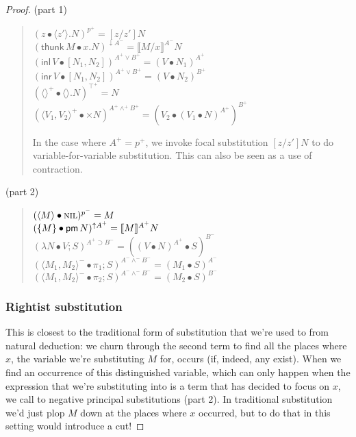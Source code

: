 \documentclass[acmtocl]{robtrans}\pdfoutput=1
\newcommand{\susp}[1]{\langle{#1}\rangle}
\newcommand{\llangle}{\llbracket}
\newcommand{\rrangle}{\rrbracket}
\newcommand{\dsrt}[1]{\mathsf{thunk}\,{#1}}
\newcommand{\etart}[1]{\langle{#1}\rangle} \newcommand{\etalt}[2]{\susp{#1}.{#2}}
\begin{document}
\begin{proof}
\bigskip
{} (part 1)
\begin{quote}
$(z \bullet \etalt{z'}{N})^{p^+} = [z/z']N$\\
$(\dsrt{M} \bullet x.N)^{{\downarrow}A^-}
   = \llbracket M/x \rrbracket^{A^-} N $\\
$(\mathsf{inl}\,V \bullet [N_1 , N_2 ])^{A^+ \vee B^+}
   = (V \bullet N_1)^{A^+}$\\
$(\mathsf{inr}\,V \bullet [N_1 , N_2 ])^{A^+ \vee B^+} 
   = (V \bullet N_2)^{B^+}$\\
$(\langle\rangle^+ \bullet \langle\rangle.N)^{\top^+} = N$\\
$(\langle V_1, V_2\rangle^+ \bullet {\times}N)^{A^+ \wedge^+ B^+} 
   = (V_2 \bullet (V_1 \bullet N)^{A^+})^{B^+}$

\medskip
In the case where $A^+ = p^+$, we invoke focal substitution $[z/z']N$
to do variable-for-variable substitution. This can also be seen as 
a use of contraction.
\end{quote}

\medskip
{} (part 2)
\begin{quote}
$(\etart{M} \bullet \textsc{nil})^{p^-} = M$\\
$(\usrt{M} \bullet \uslt{N})^{{\uparrow}A^+} = \llangle M \rrangle^{A^+} N$\\
$(\lambda N \bullet V; S)^{A^+ \supset B^-} 
   = ((V \bullet N)^{A^+} \bullet S)^{B^-}$\\
$(\langle M_1, M_2 \rangle^- \bullet \pi_1; S)^{A^- \wedge^- B^-}
   = (M_1 \bullet S)^{A^-}$\\
$(\langle M_1, M_2 \rangle^- \bullet \pi_2; S)^{A^- \wedge^- B^-}
   = (M_2 \bullet S)^{B^-}$
\end{quote}

\subsubsection*{Rightist substitution} 
This is closest to the traditional form of substitution that we're
used to from natural deduction: we churn through the second term to
find all the places where $x$, the variable we're substituting $M$
for, occurs (if, indeed, any exist). When we find an occurrence of
this distinguished variable, which can only happen when the expression
that we're substituting into is a term that has decided to focus on
$x$, we call to negative principal substitutions (part 2).  In
traditional substitution we'd just plop $M$ down at the places where
$x$ occurred, but to do that in this setting would introduce a cut!


\end{proof}
\end{document}
